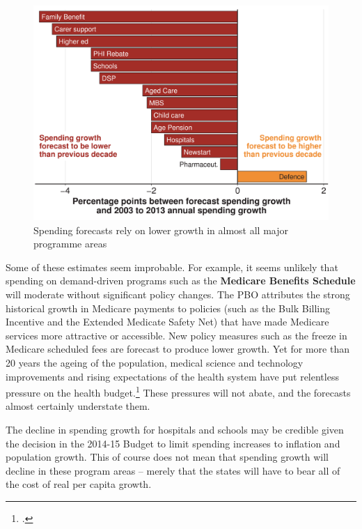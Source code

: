 \documentclass[twoside,english]{grattanBudgetRepairb5portrait}
\begin{document}
\begin{figure}
\caption{Spending forecasts rely on lower growth in almost all major programme areas\label{fig:FISCAL-8}}%
\includegraphics[width=\columnwidth]{Fiscal-challenges/figure/Figure8-altered-1.pdf}

\end{figure}

Some of these estimates seem improbable. For example, it seems unlikely that spending on demand-driven programs such as the \textbf{Medicare Benefits Schedule} will moderate without significant policy changes. The PBO attributes the strong historical growth in Medicare payments to policies (such as the Bulk Billing Incentive and the Extended Medicate Safety Net) that have made Medicare services more attractive or accessible. New policy measures such as the freeze in Medicare scheduled fees are forecast to produce lower growth. Yet for more than 20 years the ageing of the population, medical science and technology improvements and rising expectations of the health system have put relentless pressure on the health budget.\footcite{Daley2014}  These pressures will not abate, and the forecasts almost certainly understate them.

The decline in spending growth for hospitals and schools may be credible given the decision in the 2014-15 Budget to limit spending increases to inflation and population growth. This of course does not mean that spending growth will decline in these program areas – merely that the states will have to bear all of the cost of real per capita growth.
\end{document}

